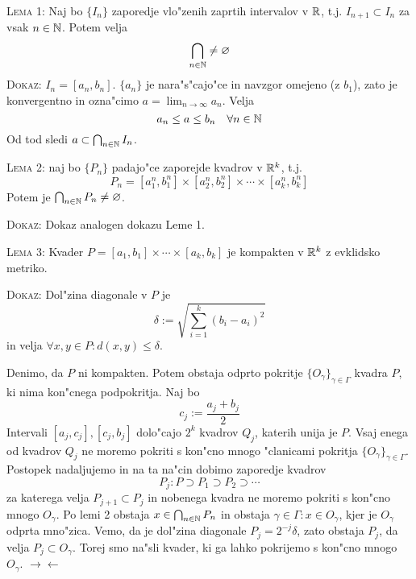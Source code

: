 \textsc{Lema 1:} Naj bo $\{ I_n \}$ zaporedje vlo"zenih zaprtih intervalov v $\mathbb{R}$, t.j. $I_{n+1} \subset I_n$ za vsak $n \in \mathbb{N}$. Potem velja
\begin{equation*}
\bigcap_{n \in \mathbb{N}} \neq \varnothing
\end{equation*}
\textsc{Dokaz:} $I_n = [a_n, b_n]$. $\{ a_n \}$ je nara"s"cajo"ce in navzgor omejeno (z $b_1$), zato je konvergentno in ozna"cimo $a = \lim_{n \to \infty} a_n$. Velja
\begin{equation*}
a_n \leq a \leq b_n \quad \forall n \in \mathbb{N}
\end{equation*}
Od tod sledi $a \subset \bigcap_{n \in \mathbb{N}} I_n$.

\textsc{Lema 2:} naj bo $\{ P_n \}$ padajo"ce zaporejde kvadrov v $\mathbb{R}^k$, t.j.
\begin{equation*}
P_n = [a_1^n, b_1^n] \times [a_2^n, b_2^n] \times \cdots \times [a_k^n, b_k^n]
\end{equation*}
Potem je $\bigcap_{n \in \mathbb{N}} P_n \neq \varnothing$.

\textsc{Dokaz:} Dokaz analogen dokazu Leme 1.

\textsc{Lema 3:} Kvader $P = [a_1, b_1] \times \cdots \times [a_k, b_k]$ je kompakten v $\mathbb{R}^k$ z evklidsko metriko.

\textsc{Dokaz:} Dol"zina diagonale v $P$ je
\begin{equation*}
\delta := \sqrt{\sum_{i = 1}^k (b_i - a_i)^2}
\end{equation*}
in velja $\forall x, y \in P: d(x, y) \leq \delta$.

Denimo, da $P$ ni kompakten. Potem obstaja odprto pokritje $\{ O_\gamma \}_{\gamma \in \Gamma}$ kvadra $P$, ki nima kon"cnega podpokritja. Naj bo
\begin{equation*}
c_j := \dfrac{a_j + b_j}{2}
\end{equation*}
Intervali $[a_j, c_j], [c_j, b_j]$ dolo"cajo $2^k$ kvadrov $Q_j$, katerih unija je $P$. Vsaj enega od kvadrov $Q_j$ ne moremo pokriti s kon"cno mnogo "clanicami pokritja $\{ O_\gamma \}_{\gamma \in \Gamma}$. Postopek nadaljujemo in na ta na"cin dobimo zaporedje kvadrov
\begin{equation*}
P_j: P \supset P_1 \supset P_2 \supset \cdots
\end{equation*}
za katerega velja $P_{j+1} \subset P_j$ in nobenega kvadra ne moremo pokriti s kon"cno mnogo $O_\gamma$. Po lemi 2 obstaja $x \in \bigcap_{n \in \mathbb{N}} P_n$ in obstaja $\gamma \in \Gamma: x \in O_\gamma$, kjer je $O_\gamma$ odprta mno"zica. Vemo, da je dol"zina diagonale $P_j = 2^{-j} \delta$, zato obstaja $P_j$, da velja $P_j \subset O_\gamma$. Torej smo na"sli kvader, ki ga lahko pokrijemo s kon"cno mnogo $O_\gamma$. $\rightarrow \leftarrow$

